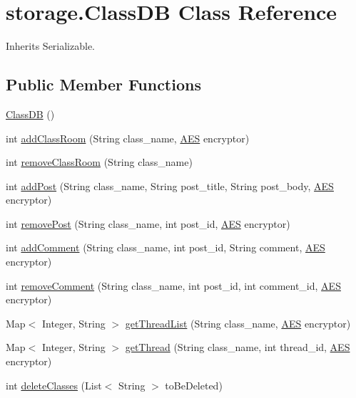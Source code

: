 \hypertarget{classstorage_1_1_class_d_b}{
\section{storage.\-Class\-D\-B \-Class \-Reference}
\label{classstorage_1_1_class_d_b}
}


\-Inherits \-Serializable.

\subsection*{\-Public \-Member \-Functions}
\begin{DoxyCompactItemize}
\item 
\hyperlink{classstorage_1_1_class_d_b_a6bd30a3543e30d0b0559bdcb034bdb66}{\-Class\-D\-B} ()
\item 
int \hyperlink{classstorage_1_1_class_d_b_ade4b805280c72b4735382c43c872935d}{add\-Class\-Room} (\-String class\-\_\-name, \hyperlink{classsecurity_1_1_a_e_s}{\-A\-E\-S} encryptor)
\item 
int \hyperlink{classstorage_1_1_class_d_b_aa8098e7b23b6fb674c525d0955033562}{remove\-Class\-Room} (\-String class\-\_\-name)
\item 
int \hyperlink{classstorage_1_1_class_d_b_ac3e2bd24a0f27b264cecbcbe9f6b3987}{add\-Post} (\-String class\-\_\-name, \-String post\-\_\-title, \-String post\-\_\-body, \hyperlink{classsecurity_1_1_a_e_s}{\-A\-E\-S} encryptor)
\item 
int \hyperlink{classstorage_1_1_class_d_b_a1d3f447ee1f61bd281edef4810354013}{remove\-Post} (\-String class\-\_\-name, int post\-\_\-id, \hyperlink{classsecurity_1_1_a_e_s}{\-A\-E\-S} encryptor)
\item 
int \hyperlink{classstorage_1_1_class_d_b_aa67f0e51c36f201f8d4de98a9cc01029}{add\-Comment} (\-String class\-\_\-name, int post\-\_\-id, \-String comment, \hyperlink{classsecurity_1_1_a_e_s}{\-A\-E\-S} encryptor)
\item 
int \hyperlink{classstorage_1_1_class_d_b_a55b3b73d1053ee23677e4d7f611820fb}{remove\-Comment} (\-String class\-\_\-name, int post\-\_\-id, int comment\-\_\-id, \hyperlink{classsecurity_1_1_a_e_s}{\-A\-E\-S} encryptor)
\item 
\-Map$<$ \-Integer, \-String $>$ \hyperlink{classstorage_1_1_class_d_b_a069572699f79cc68dd25e1ec2642bf82}{get\-Thread\-List} (\-String class\-\_\-name, \hyperlink{classsecurity_1_1_a_e_s}{\-A\-E\-S} encryptor)
\item 
\-Map$<$ \-Integer, \-String $>$ \hyperlink{classstorage_1_1_class_d_b_ad4248040de442fc758502d0fafab0558}{get\-Thread} (\-String class\-\_\-name, int thread\-\_\-id, \hyperlink{classsecurity_1_1_a_e_s}{\-A\-E\-S} encryptor)
\item 
int \hyperlink{classstorage_1_1_class_d_b_a28e36f79be33939891a3775676c954b6}{delete\-Classes} (\-List$<$ \-String $>$ to\-Be\-Deleted)
\end{DoxyCompactItemize}


